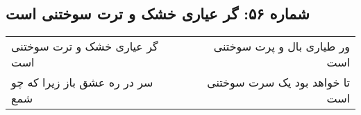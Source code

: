 \begin{center}
\section*{شماره ۵۶: گر عیاری خشک و ترت سوختنی است}
\label{sec:056}
\begin{longtable}{l p{0.5cm} r}
گر عیاری خشک و ترت سوختنی است
&&
ور طیاری بال و پرت سوختنی است
\\
سر در ره عشق باز زیرا که چو شمع
&&
تا خواهد بود یک سرت سوختنی است
\\
\end{longtable}
\end{center}
